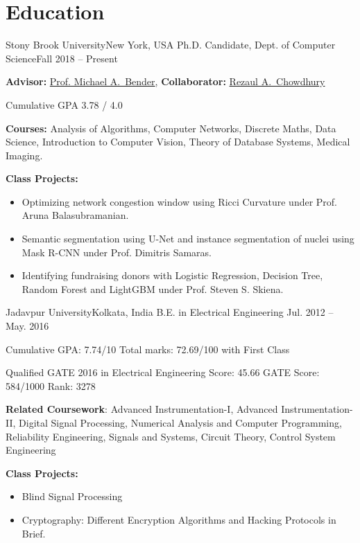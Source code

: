 \documentclass[letterpaper,10pt]{article}
\begin{document}
\section*{Education}
\resumeSubHeadingListStart
\resumeSubheading
{Stony Brook University}{New York, USA}
{Ph.D. Candidate, Dept. of Computer Science}{Fall 2018 -- Present}
\resumeItemListStart
\item \textbf{Advisor:} \href{https://www3.cs.stonybrook.edu/~bender/}{Prof. Michael A.\ Bender}, \textbf{Collaborator:} \href{https://www3.cs.stonybrook.edu/~rezaul/}{Rezaul A.\ Chowdhury}
\item Cumulative GPA 3.78 / 4.0
\item \textbf{Courses:} Analysis of Algorithms, Computer Networks, Discrete Maths, Data Science, Introduction to Computer Vision, Theory of Database Systems, Medical Imaging.
\item \textbf{Class Projects:} 
\begin{itemize}
    \item {Optimizing network congestion window using Ricci Curvature under Prof. Aruna Balasubramanian.}
    \item {Semantic segmentation using U-Net and instance segmentation of nuclei using Mask R-CNN under Prof. Dimitris Samaras.}
    \item {Identifying fundraising donors with Logistic Regression, Decision Tree, Random Forest and LightGBM under Prof. Steven S. Skiena.}
\end{itemize}
\resumeItemListEnd
\resumeSubheading
{Jadavpur University}{Kolkata, India}
{B.E. in Electrical Engineering }{Jul. 2012 -- May. 2016}
\resumeItemListStart
\item {Cumulative GPA: 7.74/10 Total marks: 72.69/100 with First Class}
\item {Qualified GATE 2016 in Electrical Engineering Score: 45.66 GATE Score: 584/1000 Rank: 3278}
\item {\textbf{Related Coursework}: Advanced Instrumentation-I, Advanced Instrumentation-II, Digital Signal Processing, Numerical Analysis and Computer Programming, Reliability Engineering, Signals and Systems, Circuit Theory, Control System Engineering}
\item \textbf{Class Projects:} 
\begin{itemize}
    \item {Blind Signal Processing}
    \item {Cryptography: Different Encryption Algorithms and Hacking Protocols in Brief.}
\end{itemize}
\end{document}
